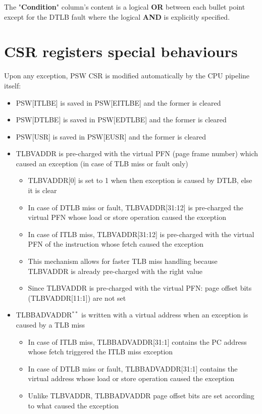 \documentclass[a4paper,11pt]{article}
\begin{document}
The "\textbf{Condition}" column's content is a logical \textbf{OR} between each bullet point except for the DTLB fault where the logical \textbf{AND} is explicitly specified.

\section{CSR registers special behaviours}

Upon any exception, PSW CSR is modified automatically by the CPU pipeline itself:

\begin{itemize}
	\item PSW[ITLBE] is saved in PSW[EITLBE] and the former is cleared
	\item PSW[DTLBE] is saved in PSW[EDTLBE] and the former is cleared
	\item PSW[USR] is saved in PSW[EUSR] and the former is cleared
	\item TLBVADDR is pre-charged with the virtual PFN (page frame number) which caused an exception (in case of TLB miss or fault only)
	\begin{itemize}
		\item TLBVADDR[0] is set to 1 when then exception is caused by DTLB, else it is clear
		\item In case of DTLB miss or fault, TLBVADDR[31:12] is pre-charged the virtual PFN whose load or store operation caused the exception
		\item In case of ITLB miss, TLBVADDR[31:12] is pre-charged with the virtual PFN of the instruction whose fetch caused the exception
		\item This mechanism allows for faster TLB miss handling because TLBVADDR is already pre-charged with the right value
		\item Since TLBVADDR is pre-charged with the virtual PFN: page offset bits (TLBVADDR[11:1]) are not set
	\end{itemize}
	\item TLBBADVADDR$^{**}$ is written with a virtual address when an exception is caused by a TLB miss
	\begin{itemize}
		\item In case of ITLB miss, TLBBADVADDR[31:1] contains the PC address whose fetch triggered the ITLB miss exception
		\item In case of DTLB miss or fault, TLBBADVADDR[31:1] contains the virtual address whose load or store operation caused the exception
		\item Unlike TLBVADDR, TLBBADVADDR page offset bits are set according to what caused the exception
	\end{itemize}
\end{itemize}
\end{document}
